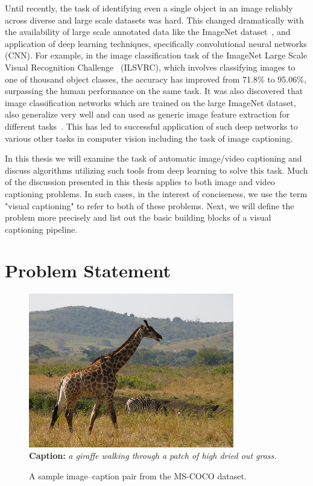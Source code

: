 Until recently, the task of identifying even a single object in an image
reliably across diverse and large scale datasets was hard.
This changed dramatically with the availability of large scale annotated data
like the ImageNet dataset~\cite{ImagenetOrig}, and  application of deep learning
techniques, specifically convolutional neural networks (CNN).
For example, in the image classification task of the ImageNet Large Scale Visual
Recognition Challenge~\cite{ILSVRC15} (ILSVRC), which involves classifying
images to one of thousand object classes, the accuracy has improved from 71.8\%
to 95.06\%, surpassing the human performance on the same task. 
It was also discovered that image classification networks which are trained on
the large ImageNet dataset, also generalize very well and can used as generic
image feature extraction for different tasks~\cite{yosinski2014transferable}.
This has led to successful application of such deep networks to various other
tasks in computer vision including the task of image captioning.

In this thesis we will examine the task of automatic image/video captioning and
discuss algorithms utilizing such tools from deep learning to solve this task.
Much of the discussion presented in this thesis applies to both image and video
captioning problems.
In such cases, in the interest of conciseness, we use the term "visual
captioning" to refer to both of these problems.
Next, we will define the problem more precisely and list out the basic building
blocks of a visual captioning pipeline.

\section{Problem Statement}
\begin{figure}[th]
	\centering
	\includegraphics[width=0.8\textwidth]{./images/COCO_train2014_000000544856.jpg}\\
    \textbf{Caption:} \emph{a giraffe walking through a patch of high dried out grass.}
	\caption{A sample image--caption pair from the MS-COCO dataset.}
	\label{fig:ExampleCap}
\end{figure}


